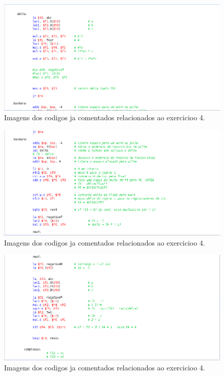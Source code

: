 \documentclass[12pt]{article}
\begin{document}
\begin{figure}[H]
	\centering
	\includegraphics[width=1\textwidth]{EX_4_4.png}
	\caption{Imagens dos codigos ja comentados relacionados ao exercicioo 4.}
	\label{fig:hilo}
\end{figure}

\begin{figure}[H]
	\centering
	\includegraphics[width=1\textwidth]{EX_4_5.png}
	\caption{Imagens dos codigos ja comentados relacionados ao exercicioo 4.}
	\label{fig:hilo}
\end{figure}

\begin{figure}[H]
	\centering
	\includegraphics[width=1\textwidth]{EX_4_6.png}
	\caption{Imagens dos codigos ja comentados relacionados ao exercicioo 4.}
	\label{fig:hilo}
\end{figure}
\end{document}
